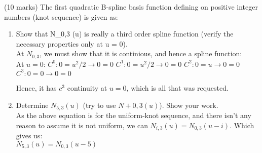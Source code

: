 (10 marks) The first quadratic B-spline basis function defining on positive integer numbers (knot sequence) is given as: \\
\begin{enumerate}
\item Show that N_{0,3} (u) is really a third order spline function (verify the necessary properties only at u = 0). \\

At $N_{0,3}$, we must show that it is continious, and hence a spline function: \\
At $u=0$:
$C^0 : 0 = u^2/2 \to  0  = 0$
$C^1 : 0 = u^2/2 \to  0  = 0$
$C^2 : 0 = u \to 0 = 0$
$C^3 : 0 = 0 \to 0 = 0$

Hence, it has $c^3$ continuity at $u=0$, which is all that was requested. \\

\item Determine $N_{5,3} (u)$ (try to use $N+{0,3} (u)$). Show your work. \\
As the above equation is for the uniform-knot sequence, and there isn't any reason to assume it is not uniform, we can $N_{i,3}(u) = N_{0,3}(u-i)$. Which gives us: \\
$N_{5,3}(u) = N_{0,3}(u - 5)$ \\
\end{enumerate}
